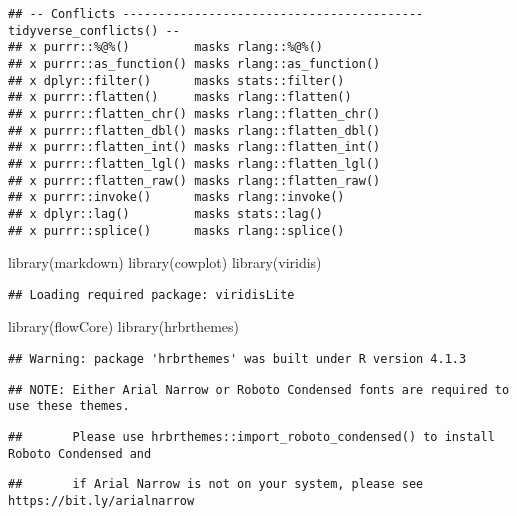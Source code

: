 \documentclass[
]{article}
\newenvironment{Shaded}{\begin{snugshade}}{\end{snugshade}}
\newcommand{\FunctionTok}[1]{\textcolor[rgb]{0.00,0.00,0.00}{#1}}
\newcommand{\NormalTok}[1]{#1}
\begin{document}
\begin{verbatim}
## -- Conflicts ------------------------------------------ tidyverse_conflicts() --
## x purrr::%@%()         masks rlang::%@%()
## x purrr::as_function() masks rlang::as_function()
## x dplyr::filter()      masks stats::filter()
## x purrr::flatten()     masks rlang::flatten()
## x purrr::flatten_chr() masks rlang::flatten_chr()
## x purrr::flatten_dbl() masks rlang::flatten_dbl()
## x purrr::flatten_int() masks rlang::flatten_int()
## x purrr::flatten_lgl() masks rlang::flatten_lgl()
## x purrr::flatten_raw() masks rlang::flatten_raw()
## x purrr::invoke()      masks rlang::invoke()
## x dplyr::lag()         masks stats::lag()
## x purrr::splice()      masks rlang::splice()
\end{verbatim}

\begin{Shaded}
\begin{Highlighting}[]
\FunctionTok{library}\NormalTok{(markdown)}
\FunctionTok{library}\NormalTok{(cowplot)}
\FunctionTok{library}\NormalTok{(viridis)}
\end{Highlighting}
\end{Shaded}

\begin{verbatim}
## Loading required package: viridisLite
\end{verbatim}

\begin{Shaded}
\begin{Highlighting}[]
\FunctionTok{library}\NormalTok{(flowCore)}
\FunctionTok{library}\NormalTok{(hrbrthemes)}
\end{Highlighting}
\end{Shaded}

\begin{verbatim}
## Warning: package 'hrbrthemes' was built under R version 4.1.3
\end{verbatim}

\begin{verbatim}
## NOTE: Either Arial Narrow or Roboto Condensed fonts are required to use these themes.
\end{verbatim}

\begin{verbatim}
##       Please use hrbrthemes::import_roboto_condensed() to install Roboto Condensed and
\end{verbatim}

\begin{verbatim}
##       if Arial Narrow is not on your system, please see https://bit.ly/arialnarrow
\end{verbatim}
\end{document}
